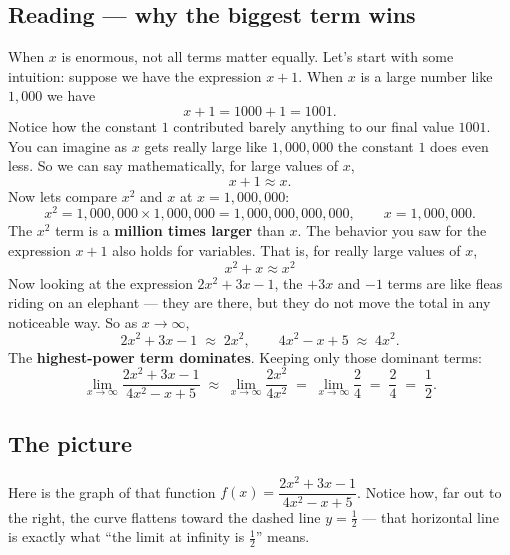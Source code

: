 \documentclass[12pt]{article}
\begin{document}
\subsection*{Reading --- why the biggest term wins}
When $x$ is enormous, not all terms matter equally. Let's start with some intuition: suppose we have the expression $x+1$. When $x$ is a large number like $1{,}000$ we have 
\[
    x + 1 = 1000 + 1 = 1001.
\]
Notice how the constant $1$ contributed barely anything to our final value $1001$. You can imagine as $x$ gets really large like $1{,}000{,}000$ the constant $1$ does even less. So we can say mathematically, for large values of $x$,
\[
    x + 1 \approx x.
\]
Now lets compare $x^2$ and $x$ at $x = 1{,}000{,}000$:
\[
  x^2 = 1{,}000{,}000 \times 1{,}000{,}000 = 1{,}000{,}000{,}000{,}000, \qquad x = 1{,}000{,}000.
\]
The $x^2$ term is a \textbf{million times larger} than $x$. The behavior you saw for the expression $x + 1$ also holds for variables. That is, for really large values of $x$, 
\[
    x^2 + x \approx x^2
\]
Now looking at the expression $2x^2 + 3x - 1$, the $+3x$ and $-1$ terms are like fleas riding on an
elephant --- they are there, but they do not move the total in any noticeable way. So as $x \to \infty$,
\[
  2x^2 + 3x - 1 \;\approx\; 2x^2, \qquad 4x^2 - x + 5 \;\approx\; 4x^2.
\]
The \textbf{highest-power term dominates}. Keeping only those dominant terms:
\[
  \lim_{x \to \infty} \frac{2x^2 + 3x - 1}{4x^2 - x + 5}
  \;\approx\; \lim_{x \to \infty} \frac{2x^2}{4x^2}
  \;=\; \lim_{x \to \infty} \frac{2}{4}
  \;=\; \frac{2}{4} \;=\; \frac{1}{2}.
\]

\subsection*{The picture}
Here is the graph of that function $f(x) = \dfrac{2x^2 + 3x - 1}{4x^2 - x + 5}$. Notice how, far out to the right, the curve flattens toward
the dashed line $y = \tfrac{1}{2}$ --- that horizontal line is exactly what ``the limit at infinity is $\tfrac12$''
means.

\begin{center}
\end{center}
\end{document}
